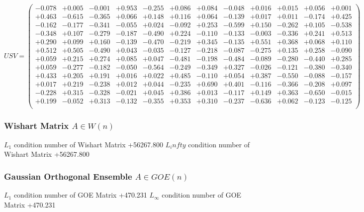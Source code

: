 \documentclass[9pt]{article}
\theoremstyle{plain}
\theoremstyle{definition}
\theoremstyle{remark}
\numberwithin{equation}{section}
\begin{document}
$U S V = \left(
\begin{array}{
cccccccccccc}
-0.078 & +0.005 & -0.001 & +0.953 & -0.255 & +0.086 & +0.084 & -0.048 & +0.016 & +0.015 & +0.056 & +0.001 \\
+0.463 & -0.615 & -0.365 & +0.066 & +0.148 & +0.116 & +0.064 & -0.139 & +0.017 & +0.011 & -0.174 & +0.425 \\
-0.162 & -0.177 & -0.341 & -0.055 & +0.024 & -0.092 & +0.253 & -0.599 & +0.150 & -0.262 & +0.105 & -0.538 \\
-0.348 & +0.107 & -0.279 & -0.187 & -0.490 & +0.224 & -0.110 & -0.133 & -0.003 & -0.336 & +0.241 & +0.513 \\
+0.290 & +0.099 & +0.160 & -0.139 & -0.470 & -0.219 & +0.345 & -0.135 & +0.551 & +0.368 & +0.068 & +0.110 \\
+0.512 & +0.505 & -0.490 & +0.043 & -0.035 & -0.127 & -0.218 & -0.087 & -0.275 & +0.135 & +0.258 & -0.090 \\
+0.059 & +0.215 & +0.274 & +0.085 & +0.047 & -0.481 & -0.198 & -0.484 & -0.089 & -0.280 & -0.440 & +0.285 \\
+0.059 & -0.277 & -0.182 & -0.050 & -0.564 & -0.249 & -0.349 & +0.327 & -0.026 & -0.121 & -0.380 & -0.340 \\
+0.433 & +0.205 & +0.191 & +0.016 & +0.022 & +0.485 & -0.110 & +0.054 & +0.387 & -0.550 & -0.088 & -0.157 \\
+0.017 & +0.219 & -0.238 & +0.012 & +0.044 & -0.235 & +0.690 & +0.401 & -0.116 & -0.366 & -0.208 & +0.097 \\
-0.228 & +0.315 & -0.328 & -0.021 & +0.045 & +0.386 & +0.013 & -0.117 & +0.149 & +0.363 & -0.650 & -0.015 \\
+0.199 & -0.052 & +0.313 & -0.132 & -0.355 & +0.353 & +0.310 & -0.237 & -0.636 & +0.062 & -0.123 & -0.125 \\
\end{array}
\right)$ \newline 

\subsubsection{Wishart Matrix $A \in W(n)$}
$L_1$ condition number of Wishart Matrix +56267.800
$L_infty$ condition number of Wishart Matrix +56267.800
\subsubsection{Gaussian Orthogonal Ensemble $A \in GOE(n)$}
$L_1$ condition number of GOE Matrix +470.231
$L_\infty$ condition number of GOE Matrix +470.231
\end{document}
